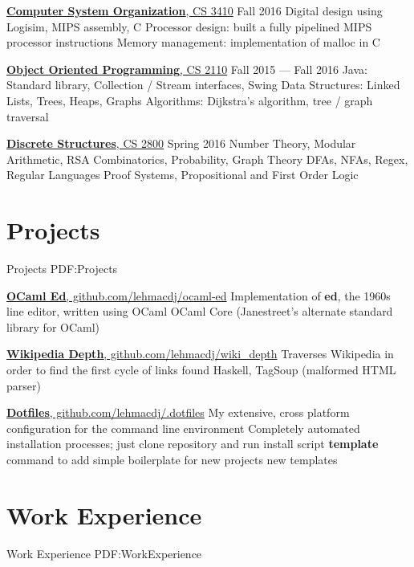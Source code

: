 \documentclass[letterpaper,10pt,oneside]{simpleresumecv}
\begin{document}
\begin{minipage}[t][0pt]{\linewidth}
\begin{body}
\href{https://www.cs.cornell.edu/courses/cs3410/2016fa/}
{\textbf{Computer System Organization}, CS 3410}
\hfill Fall 2016
\BulletItem%
Digital design using Logisim, MIPS assembly, C
\BulletItem%
Processor design: built a fully pipelined MIPS processor
instructions
\BulletItem%
Memory management: implementation of malloc in C

\href{https://www.cs.cornell.edu/courses/cs2110/2015fa/}
{\textbf{Object Oriented Programming}, CS 2110}
\hfill Fall 2015 --- Fall 2016
\BulletItem%
Java: Standard library, Collection / Stream interfaces, Swing
\BulletItem%
Data Structures: Linked Lists, Trees, Heaps, Graphs
\BulletItem%
Algorithms: Dijkstra's algorithm, tree / graph traversal

\href{https://www.cs.cornell.edu/courses/cs2800/2016sp/}
{\textbf{Discrete Structures}, CS 2800}
\hfill Spring 2016
\BulletItem%
Number Theory, Modular Arithmetic, RSA
\BulletItem%
Combinatorics, Probability, Graph Theory
\BulletItem%
DFAs, NFAs, Regex, Regular Languages
\BulletItem%
Proof Systems, Propositional and First Order Logic


\section%
{Projects}
{Projects}
{PDF:Projects}

\href{https://www.github.com/lehmacdj/ocaml-ed}
{\textbf{OCaml Ed}, github.com/lehmacdj/ocaml-ed}
\BulletItem%
Implementation of \textbf{ed}, the 1960s line editor, written using OCaml
\BulletItem%
OCaml Core (Janestreet's alternate standard library for OCaml)

\href{https://www.github.com/lehmacdj/wiki_depth}
{\textbf{Wikipedia Depth}, github.com/lehmacdj/wiki\_depth}
\BulletItem%
Traverses Wikipedia in order to find the first cycle of links found
\BulletItem%
Haskell, TagSoup (malformed HTML parser)

\href{https://www.github.com/lehmacdj/.dotfiles}
{\textbf{Dotfiles}, github.com/lehmacdj/.dotfiles}
\BulletItem%
My extensive, cross platform configuration for the command line environment
\BulletItem%
Completely automated installation processes; just clone repository and run
install script
\BulletItem%
\textbf{template} command to add simple boilerplate for new projects
new templates

\section%
{Work Experience}
{Work Experience}
{PDF:WorkExperience}


\end{body}
\end{minipage}
\end{document}
